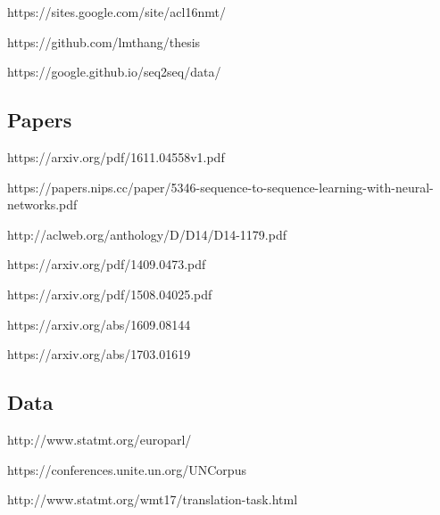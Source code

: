 \documentclass[10pt,a4paper]{report}
\begin{document}
https://sites.google.com/site/acl16nmt/

https://github.com/lmthang/thesis

https://google.github.io/seq2seq/data/


\subsection{Papers}

https://arxiv.org/pdf/1611.04558v1.pdf

https://papers.nips.cc/paper/5346-sequence-to-sequence-learning-with-neural-networks.pdf

http://aclweb.org/anthology/D/D14/D14-1179.pdf

https://arxiv.org/pdf/1409.0473.pdf

https://arxiv.org/pdf/1508.04025.pdf

https://arxiv.org/abs/1609.08144

https://arxiv.org/abs/1703.01619


\subsection{Data}

http://www.statmt.org/europarl/

https://conferences.unite.un.org/UNCorpus

http://www.statmt.org/wmt17/translation-task.html
\end{document}
